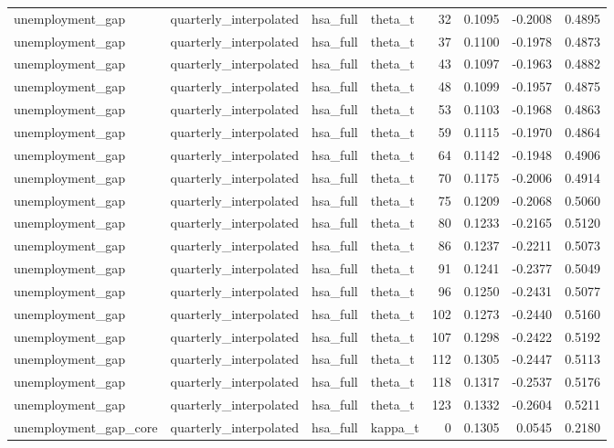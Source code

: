 \begin{tabular}{llllrrrr}
unemployment\_gap & quarterly\_interpolated & hsa\_full & theta\_t & 32 & 0.1095 & -0.2008 & 0.4895 \\
unemployment\_gap & quarterly\_interpolated & hsa\_full & theta\_t & 37 & 0.1100 & -0.1978 & 0.4873 \\
unemployment\_gap & quarterly\_interpolated & hsa\_full & theta\_t & 43 & 0.1097 & -0.1963 & 0.4882 \\
unemployment\_gap & quarterly\_interpolated & hsa\_full & theta\_t & 48 & 0.1099 & -0.1957 & 0.4875 \\
unemployment\_gap & quarterly\_interpolated & hsa\_full & theta\_t & 53 & 0.1103 & -0.1968 & 0.4863 \\
unemployment\_gap & quarterly\_interpolated & hsa\_full & theta\_t & 59 & 0.1115 & -0.1970 & 0.4864 \\
unemployment\_gap & quarterly\_interpolated & hsa\_full & theta\_t & 64 & 0.1142 & -0.1948 & 0.4906 \\
unemployment\_gap & quarterly\_interpolated & hsa\_full & theta\_t & 70 & 0.1175 & -0.2006 & 0.4914 \\
unemployment\_gap & quarterly\_interpolated & hsa\_full & theta\_t & 75 & 0.1209 & -0.2068 & 0.5060 \\
unemployment\_gap & quarterly\_interpolated & hsa\_full & theta\_t & 80 & 0.1233 & -0.2165 & 0.5120 \\
unemployment\_gap & quarterly\_interpolated & hsa\_full & theta\_t & 86 & 0.1237 & -0.2211 & 0.5073 \\
unemployment\_gap & quarterly\_interpolated & hsa\_full & theta\_t & 91 & 0.1241 & -0.2377 & 0.5049 \\
unemployment\_gap & quarterly\_interpolated & hsa\_full & theta\_t & 96 & 0.1250 & -0.2431 & 0.5077 \\
unemployment\_gap & quarterly\_interpolated & hsa\_full & theta\_t & 102 & 0.1273 & -0.2440 & 0.5160 \\
unemployment\_gap & quarterly\_interpolated & hsa\_full & theta\_t & 107 & 0.1298 & -0.2422 & 0.5192 \\
unemployment\_gap & quarterly\_interpolated & hsa\_full & theta\_t & 112 & 0.1305 & -0.2447 & 0.5113 \\
unemployment\_gap & quarterly\_interpolated & hsa\_full & theta\_t & 118 & 0.1317 & -0.2537 & 0.5176 \\
unemployment\_gap & quarterly\_interpolated & hsa\_full & theta\_t & 123 & 0.1332 & -0.2604 & 0.5211 \\
unemployment\_gap\_core & quarterly\_interpolated & hsa\_full & kappa\_t & 0 & 0.1305 & 0.0545 & 0.2180 \\

\end{tabular}
